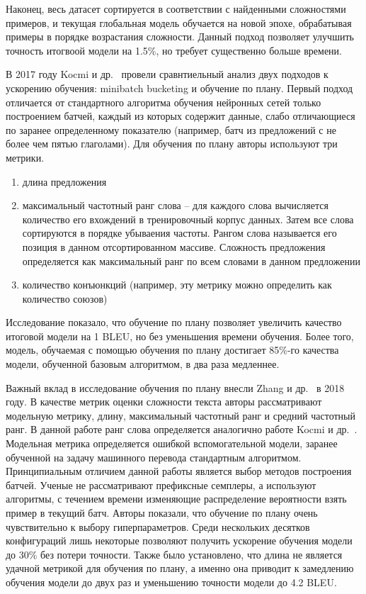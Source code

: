 \documentclass{spbau-diploma}
\begin{document}
Наконец, весь датасет сортируется в соответствии с найденными сложностями примеров, и текущая глобальная модель обучается на новой эпохе, обрабатывая примеры в порядке возрастания сложности. Данный подход позволяет улучшить точность итогвоой модели на 1.5\%, но требует существенно больше времени.

В 2017 году Kocmi и др.~\cite{kocmi2017curriculum} провели сравнтиельный анализ двух подходов к ускорению обучения: minibatch bucketing и обучение по плану. Первый подход отличается от стандартного алгоритма обучения нейронных сетей только построением батчей, каждый из которых содержит данные, слабо отличающиеся по заранее определенному показателю (например, батч из предложений с не более чем пятью глаголами). Для обучения по плану авторы используют три метрики.
\begin{enumerate}
	\item длина предложения
	\item максимальный частотный ранг слова -- для каждого слова вычисляется количество его вхождений в тренировочный корпус данных. Затем все слова сортируются в порядке убываения частоты. Рангом слова называется его позиция в данном отсортированном массиве. Сложность предложения определяется как максимальный ранг по всем словами в данном предложении
	\item количество конъюнкций (например, эту метрику можно определить как количество союзов)
\end{enumerate}

Исследование показало, что обучение по плану позволяет увеличить качество итоговой модели на 1 BLEU, но без уменьшения времени обучения. Более того, модель, обучаемая с помощью обучения по плану достигает 85\%-го качества модели, обученной базовым алгоритмом, в два раза медленнее.

Важный вклад в исследование обучения по плану внесли Zhang и др.~\cite{zhang2018empirical} в 2018 году. В качестве метрик оценки сложности текста авторы рассматривают модельную метрику, длину, максимальный частотный ранг и средний частотный ранг. В данной работе ранг слова определяется аналогично работе Kocmi и др.~\cite{kocmi2017curriculum}. Модельная метрика определяется ошибкой вспомогательной модели, заранее обученной на задачу машинного перевода стандартным алгоритмом. Принципиальным отличием данной работы является выбор методов построения батчей. Ученые не рассматривают префиксные семплеры, а используют алгоритмы, с течением времени изменяющие распределение вероятности взять пример в текущий батч. Авторы показали, что обучение по плану очень чувствительно к выбору гиперпараметров. Среди нескольких десятков конфигураций лишь некоторые позволяют получить ускорение обучения модели до 30\% без потери точности. Также было установлено, что длина не является удачной метрикой для обучения по плану, а именно она приводит к замедлению обучения модели до двух раз и уменьшению точности модели до 4.2 BLEU.
\end{document}
